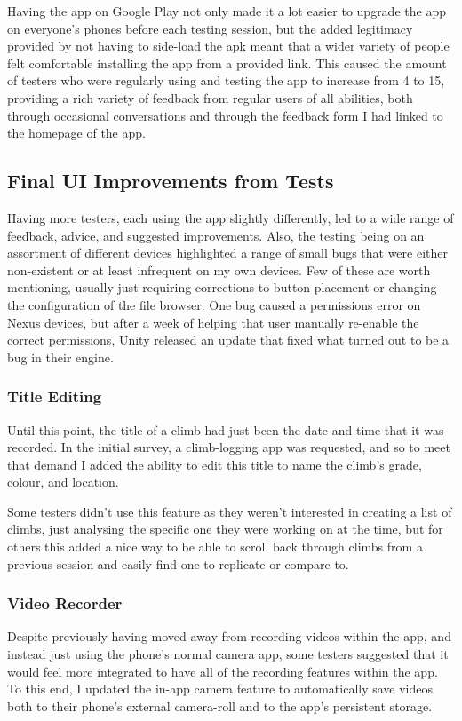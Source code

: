 Having the app on Google Play not only made it a lot easier to upgrade the app on everyone's phones before each testing session, but the added legitimacy provided by not having to side-load the apk meant that a wider variety of people felt comfortable installing the app from a provided link.
This caused the amount of testers who were regularly using and testing the app to increase from 4 to 15, providing a rich variety of feedback from regular users of all abilities, both through occasional conversations and through the feedback form I had linked to the homepage of the app.




\subsection{Final UI Improvements from Tests}
Having more testers, each using the app slightly differently, led to a wide range of feedback, advice, and suggested improvements.
Also, the testing being on an assortment of different devices highlighted a range of small bugs that were either non-existent or at least infrequent on my own devices.
Few of these are worth mentioning, usually just requiring corrections to button-placement or changing the configuration of the file browser.
One bug caused a permissions error on Nexus devices, but after a week of helping that user manually re-enable the correct permissions, Unity released an update that fixed what turned out to be a bug in their engine.

\subsubsection{Title Editing}
Until this point, the title of a climb had just been the date and time that it was recorded.
In the initial survey, a climb-logging app was requested, and so to meet that demand I added the ability to edit this title to name the climb's grade, colour, and location.

Some testers didn't use this feature as they weren't interested in creating a list of climbs, just analysing the specific one they were working on at the time, but for others this added a nice way to be able to scroll back through climbs from a previous session and easily find one to replicate or compare to.


\subsubsection{Video Recorder}
Despite previously having moved away from recording videos within the app, and instead just using the phone's normal camera app, some testers suggested that it would feel more integrated to have all of the recording features within the app.
To this end, I updated the in-app camera feature to automatically save videos both to their phone's external camera-roll and to the app's persistent storage.


